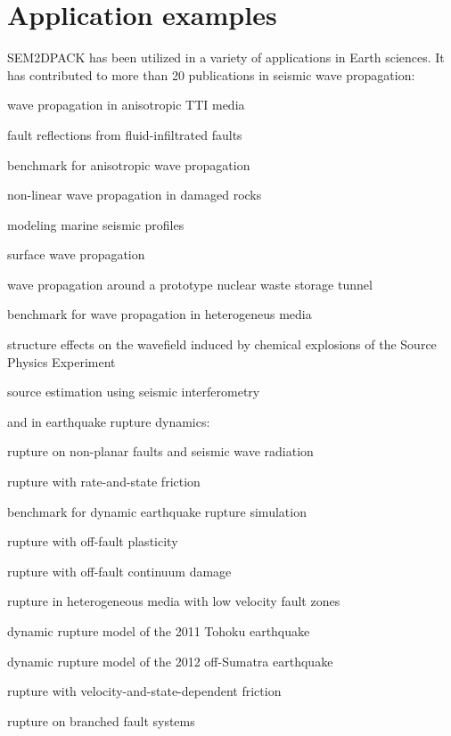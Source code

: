\section{Application examples}

SEM2DPACK has been utilized in a variety of applications in Earth sciences.
It has contributed to more than 20 publications in seismic wave propagation:

\begin{sitemize}
  \item wave propagation in anisotropic TTI media 
  \item fault reflections from fluid-infiltrated faults 
  \item benchmark for anisotropic wave propagation 
  \item non-linear wave propagation in damaged rocks  
  \item modeling marine seismic profiles 
  \item surface wave propagation  
  \item wave propagation around a prototype nuclear waste storage tunnel  
  \item benchmark for wave propagation in heterogeneus media 
  \item structure effects on the wavefield induced by chemical explosions of the Source Physics Experiment 
  \item source estimation using seismic interferometry 
\end{sitemize}
and in earthquake rupture dynamics:
\begin{sitemize}
  \item rupture on non-planar faults and seismic wave radiation  
  \item rupture with rate-and-state friction  
  \item benchmark for dynamic earthquake rupture simulation  
  \item rupture with off-fault plasticity  
  \item rupture with off-fault continuum damage  
  \item rupture in heterogeneous media with low velocity fault zones  
  \item dynamic rupture model of the 2011 Tohoku earthquake  
  \item dynamic rupture model of the 2012 off-Sumatra earthquake  
  \item rupture with velocity-and-state-dependent friction  
  \item rupture on branched fault systems  
\end{sitemize}

